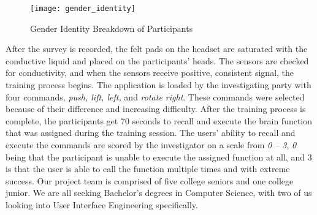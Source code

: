 \documentclass{article}
\begin{document}
\begin{figure}[h]
\centering
\texttt{[image: gender\_identity]}
\caption{Gender Identity Breakdown of Participants}
\end{figure}

After the survey is recorded, the felt pads on the headset are saturated with the conductive liquid and placed on the participants' heads. The sensors are checked for conductivity, and when the sensors receive positive, consistent signal, the training process begins. 
\newline \newline
The application is loaded by the investigating party with four commands, \textit{push, lift, left,} and \textit{rotate right}. These commands were selected because of their difference and increasing difficulty. After the training process is complete, the participants get 70 seconds to recall and execute the brain function that was assigned during the training session. 
\newline \newline
The users' ability to recall and execute the commands are scored by the investigator on a scale from \textit{0 -- 3}, \textit{0} being that the participant is unable to execute the assigned function at all, and 3 is that the user is able to call the function multiple times and with extreme success.  
\newline\newline 
Our project team is comprised of five college seniors and one college junior. We are all seeking Bachelor's degrees in Computer Science, with two of us looking into User Interface Engineering specifically.

\end{document}
